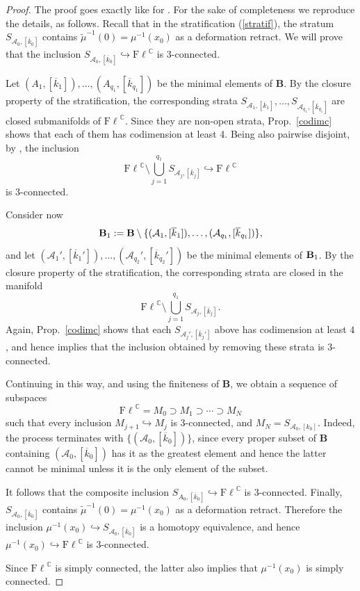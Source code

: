 \documentclass[12pt]{amsart}
\theoremstyle{definition}
\theoremstyle{remark}
\newcommand{\vk}{\overline{k}}
\newcommand{\A}{{\mathcal A}}
\newcommand{\Fl}{{\mathrm{F\ell}}}
\begin{document}
\begin{proof}
The proof goes exactly like for \cite[Prop.~3.4]{Ma2}. For the sake of completeness we reproduce the details, as follows. 
Recall that in the stratification (\ref{stratif}), the  stratum \(S_{\A_0,[\vk_0]}\) contains
$
\tilde\mu^{-1}(0)=\mu^{-1}(x_0)
$
as a deformation retract.
We will prove that the inclusion
$
S_{\A_0,[\vk_0]}\hookrightarrow \Fl^{\mathbb C}
$
is 3-connected.

Let \((A_1,[\vk_1]),\ldots,(A_{q_1},[\vk_{q_1}])\) be the minimal elements of {\bf B}. By the closure property of the stratification, the corresponding strata $
S_{\A_1,[\vk_1]},\ldots,S_{\A_{q_1},[\vk_{q_1}]}
$ 
are closed submanifolds of \(\Fl^{\mathbb C}\). Since they are non-open strata, Prop.~\ref{codimc} shows that each of them has codimension at least 4. Being also pairwise disjoint,  by \cite[Thm.~1.11]{BW}, the inclusion
$$
\Fl^{\mathbb C}\setminus
\bigcup_{j=1}^{q_1}S_{\A_j,[\vk_j]}
\hookrightarrow
\Fl^{\mathbb C}
$$
is \(3\)-connected.

Consider now 
$$
{\bf B}_1:={\bf B}\setminus
\{(\A_1,[\vk_1]),\ldots,(\A_{q_1},[\vk_{q_1}])\},
$$
and let
$
(\A_1',[\vk_1']),\ldots,(\A_{q_2}',[\vk_{q_2}'])
$
be the minimal elements of ${\bf B}_1$. By the closure property of the stratification, the corresponding strata are closed in the manifold
$$
\Fl^{\mathbb C}\setminus
\bigcup_{j=1}^{q_1}S_{\A_j,[\vk_j]}.
$$
Again, Prop.~\ref{codimc} shows that each $S_{\A_j',[\vk_j']}$ above has codimension at least \(4\), and hence \cite[Thm.~1.11]{BW} implies that the inclusion obtained by removing these strata is \(3\)-connected.

Continuing in this way, and using the finiteness of {\bf B}, we obtain a sequence of subspaces
$$
\Fl^{\mathbb C}=M_0\supset M_1\supset\cdots\supset M_N
$$
such that every inclusion
$
M_{j+1}\hookrightarrow M_j
$
is \(3\)-connected, and
$
M_N=S_{\A_0,[k_0]}.
$
Indeed, the process terminates with  $\{(\A_0,[\vk_0])\}$, since every proper subset of {\bf B} containing $(\A_0,[\vk_0])$  has it as the greatest element and hence the latter cannot be minimal unless it is the only element of the subset.

It follows that the composite inclusion
$
S_{A_0,[\vk_0]}
\hookrightarrow
\Fl^{\mathbb C}
$
is \(3\)-connected.
Finally, \(S_{\A_0,[\vk_0]}\) contains
$
\tilde\mu^{-1}(0)=\mu^{-1}(x_0)
$
as a deformation retract. Therefore the inclusion
 $
\mu^{-1}(x_0)\hookrightarrow S_{\A_0,[\vk_0]}
$
is a homotopy equivalence, and hence
$
\mu^{-1}(x_0)\hookrightarrow \Fl^{\mathbb C}
$
is \(3\)-connected.

Since \(\Fl^{\mathbb C}\) is simply connected, the latter also implies that \(\mu^{-1}(x_0)\) is simply connected.
\end{proof}
\end{document}
